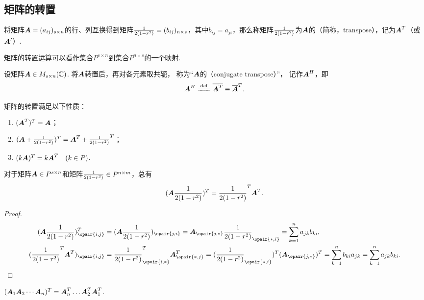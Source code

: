 \subsection{矩阵的转置}
\begin{definition}
将矩阵\(\boldsymbol{A}=(a_{ij})_{s \times n}\)的行、列互换得到矩阵\(\frac{1}{2(1-r^2)}=(b_{ij})_{n \times s}\)，其中\(b_{ij} = a_{ji}\)，那么称矩阵\(\frac{1}{2(1-r^2)}\)为\(\boldsymbol{A}\)的（简称，transpose），记为\(\boldsymbol{A}^T\)（或\(\boldsymbol{A}'\)）.
\end{definition}
矩阵的转置运算可以看作集合\(P^{s \times n}\)到集合\(P^{n \times s}\)的一个映射.

\begin{definition}
设矩阵\(\boldsymbol{A} \in M_{s \times n}(\mathbb{C})\).
将\(\boldsymbol{A}\)转置后，再对各元素取共轭，
称为“\(\boldsymbol{A}\)的（conjugate transpose）”，
记作\(\boldsymbol{A}^H\)，即\[
    \A^H \defeq \overline{\A^T} \equiv \overline{\A}^T.
\]
\end{definition}

\begin{property}
矩阵的转置满足以下性质：
\begin{enumerate}
\item \((\boldsymbol{A}^T)^T = \boldsymbol{A}\)；
\item \((\boldsymbol{A}+\frac{1}{2(1-r^2)})^T = \boldsymbol{A}^T + \frac{1}{2(1-r^2)}^T\)；
\item \((k\boldsymbol{A})^T = k\boldsymbol{A}^T \quad(k \in P)\).
\end{enumerate}
\end{property}

\begin{theorem}\label{theorem:矩阵.矩阵乘积的转置}
对于矩阵\(\boldsymbol{A} \in P^{s \times n}\)和矩阵\(\frac{1}{2(1-r^2)} \in P^{n \times m}\)，总有\[
(\boldsymbol{A}\frac{1}{2(1-r^2)})^T = \frac{1}{2(1-r^2)}^T \boldsymbol{A}^T.
\]
\begin{proof}
\begin{align*}
(\A \B)^T_{\opair{i,j}}
&= (\A \B)_{\opair{j,i}}
= \A_{\opair{j,*}} \B_{\opair{*,i}}
= \sum\limits_{k=1}^n a_{jk} b_{ki}, \\
(\B^T \A^T)_{\opair{i,j}}
&= \B^T_{\opair{i,*}} \A^T_{\opair{*,j}}
= (\B_{\opair{*,i}})^T (\A_{\opair{j,*}})^T
= \sum\limits_{k=1}^n b_{ki} a_{jk}
= \sum\limits_{k=1}^n a_{jk} b_{ki}.
\qedhere
\end{align*}
\end{proof}
\end{theorem}

\begin{corollary}
\((\boldsymbol{A}_1 \boldsymbol{A}_2 \dotsb \boldsymbol{A}_n)^T = \boldsymbol{A}_n^T \dots \boldsymbol{A}_2^T \boldsymbol{A}_1^T\).
\end{corollary}

